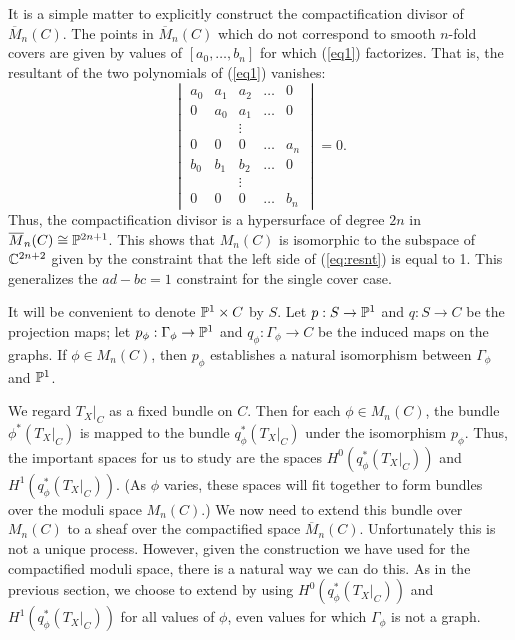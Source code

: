 It is a simple matter to explicitly construct the compactification divisor of
$\overline M_n(C)$. The points in $\overline M_n(C)$ which do not
correspond to smooth $n$-fold covers are given by values of
$[a_0,\ldots,b_n]$ for which (\ref{eq1}) factorizes. That is, the
resultant of the two polynomials of (\ref{eq1}) vanishes:
\begin{equation}
  \begin{vmatrix}
     a_0&a_1&a_2&\ldots&0\\
     0&a_0&a_1&\ldots&0\\
     &&\vdots&&\\
     0&0&0&\ldots&a_n\\
     b_0&b_1&b_2&\ldots&0\\
     &&\vdots&&\\
     0&0&0&\ldots&b_n
  \end{vmatrix}
  =0.	  \label{eq:resnt}
\end{equation}
Thus, the compactification divisor is a hypersurface of degree $2n$
in $\overline M_n(C)\cong\CP{2n+1}$. This shows that $M_n(C)$ is
isomorphic to the subspace of $\SetCx^{2n+2}$ given by the constraint
that the left side
of (\ref{eq:resnt}) is equal to 1. This generalizes the $ad-bc=1$
constraint for the single cover case.

It will be convenient to denote $\P^1\times C$ by $S$.
Let $p:S\to\P^1$ and
$q:S\to C$ be the projection maps;
let $p_{\phi}:\Gamma_{\phi}\to\P^1$ and
$q_{\phi}:\Gamma_{\phi}\to C$
be the induced maps on the graphs.
If $\phi\in M_n(C)$, then $p_{\phi}$ establishes a natural isomorphism
between $\Gamma_{\phi}$ and $\P^1$.

We regard $T_X|_C$ as a fixed bundle on $C$.  Then for each $\phi\in
M_n(C)$, the bundle $\phi^*(T_X|_C)$ is mapped to the bundle
$q_{\phi}^*(T_X|_C)$ under the isomorphism $p_{\phi}$.  Thus, the
important spaces for us to study are the spaces $H^0(q_{\phi}^*(T_X|_C))$
and $H^1(q_{\phi}^*(T_X|_C))$.  (As $\phi$ varies, these spaces will
fit together to form
bundles over the moduli space $M_n(C)$.)
We now need to extend this bundle over $M_n(C)$ to a sheaf over the
compactified space $\overline M_n(C)$. Unfortunately this is not a
unique process. However, given the construction we have used for the
compactified moduli space, there is a natural way we can do this.
As in the previous section,
we choose to extend by using $H^0(q_{\phi}^*(T_X|_C))$
and $H^1(q_{\phi}^*(T_X|_C))$ for all values of $\phi$, even values
for which $\Gamma_{\phi}$ is not a graph.

